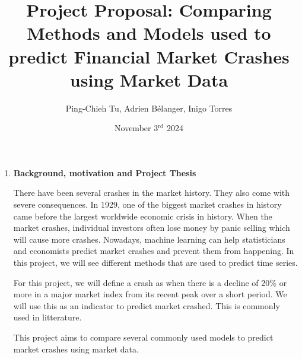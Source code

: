 \documentclass[12pt, letterpaper]{article}
\title{\Large Project Proposal: Comparing Methods and Models used to predict Financial Market Crashes using Market Data\\}
\author{Ping-Chieh Tu, Adrien Bélanger, Inigo Torres}
\date{November 3$^{\text{rd}}$ 2024}
\begin{document}
\maketitle 

\begin{enumerate}[label=]
    \item \textbf{Background, motivation and Project Thesis}

    There have been several crashes in the market history. They also come with severe consequences. In 1929, one of the biggest market crashes in history came before the largest worldwide economic crisis in history. When the market crashes, individual investors often lose money by panic selling which will cause more crashes. Nowadays, machine learning can help statisticians and economists predict market crashes and prevent them from happening. In this project, we will see different methods that are used to predict time series.

    For this project, we will define a crash as when there is a decline of 20$\%$ or more in a major market index from its recent peak over a short period. We will use this as an indicator to predict market crashed. This is commonly used in litterature.
    
    This project aims to compare several commonly used models to predict market crashes using market data.
    

\end{enumerate}
\end{document}
